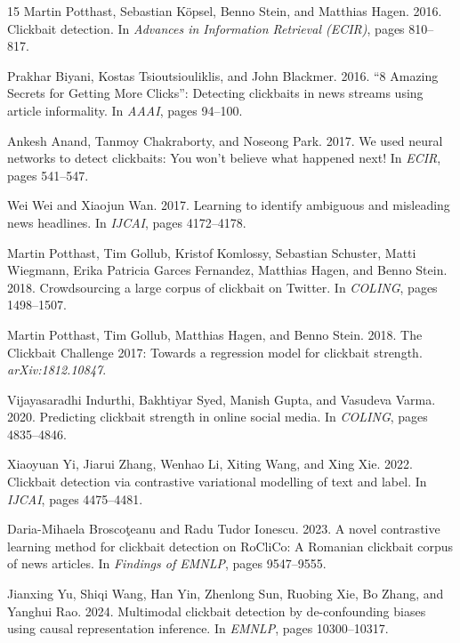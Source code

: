 \documentclass[11pt]{article}
\begin{document}
\begin{thebibliography}{15}
Martin Potthast, Sebastian K\"opsel, Benno Stein, and Matthias Hagen. 2016.
Clickbait detection. In \emph{Advances in Information Retrieval (ECIR)}, pages 810--817.

Prakhar Biyani, Kostas Tsioutsiouliklis, and John Blackmer. 2016.
``8 Amazing Secrets for Getting More Clicks'': Detecting clickbaits in news streams using article informality. In \emph{AAAI}, pages 94--100.

Ankesh Anand, Tanmoy Chakraborty, and Noseong Park. 2017.
We used neural networks to detect clickbaits: You won't believe what happened next! In \emph{ECIR}, pages 541--547.

Wei Wei and Xiaojun Wan. 2017.
Learning to identify ambiguous and misleading news headlines. In \emph{IJCAI}, pages 4172--4178.

Martin Potthast, Tim Gollub, Kristof Komlossy, Sebastian Schuster, Matti Wiegmann, Erika Patricia Garces Fernandez, Matthias Hagen, and Benno Stein. 2018.
Crowdsourcing a large corpus of clickbait on Twitter. In \emph{COLING}, pages 1498--1507.

Martin Potthast, Tim Gollub, Matthias Hagen, and Benno Stein. 2018.
The Clickbait Challenge 2017: Towards a regression model for clickbait strength. \emph{arXiv:1812.10847}.

Vijayasaradhi Indurthi, Bakhtiyar Syed, Manish Gupta, and Vasudeva Varma. 2020.
Predicting clickbait strength in online social media. In \emph{COLING}, pages 4835--4846.

Xiaoyuan Yi, Jiarui Zhang, Wenhao Li, Xiting Wang, and Xing Xie. 2022.
Clickbait detection via contrastive variational modelling of text and label. In \emph{IJCAI}, pages 4475--4481.

Daria-Mihaela Brosco\c{t}eanu and Radu Tudor Ionescu. 2023.
A novel contrastive learning method for clickbait detection on RoCliCo: A Romanian clickbait corpus of news articles. In \emph{Findings of EMNLP}, pages 9547--9555.

Jianxing Yu, Shiqi Wang, Han Yin, Zhenlong Sun, Ruobing Xie, Bo Zhang, and Yanghui Rao. 2024.
Multimodal clickbait detection by de-confounding biases using causal representation inference. In \emph{EMNLP}, pages 10300--10317.


\end{thebibliography}
\end{document}
